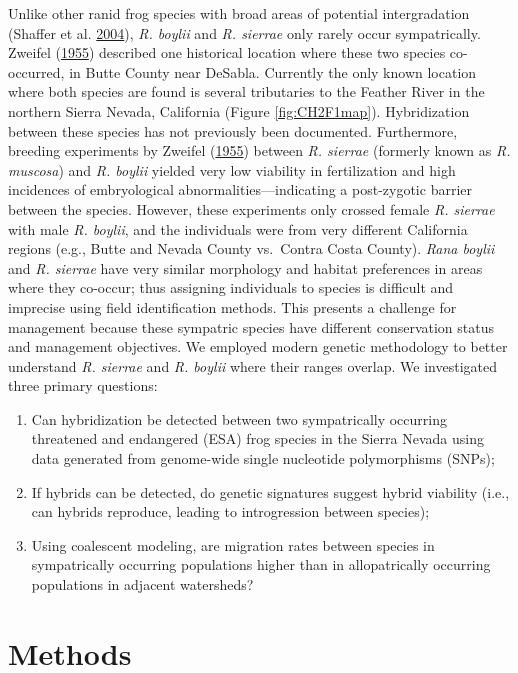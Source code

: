 \documentclass[proquest,12pt,final]{ucthesis-CA2012} %
\providecommand{\tightlist}{%
  \setlength{\itemsep}{0pt}\setlength{\parskip}{0pt}}
\begin{document}
\begin{ucmainmatter}
Unlike other ranid frog species with broad areas of potential
intergradation (Shaffer et al.
\protect\hyperlink{ref-shaffer_species_2004}{2004}), \emph{R. boylii}
and \emph{R. sierrae} only rarely occur sympatrically. Zweifel
(\protect\hyperlink{ref-zweifel_ecology_1955}{1955}) described one
historical location where these two species co-occurred, in Butte County
near DeSabla. Currently the only known location where both species are
found is several tributaries to the Feather River in the northern Sierra
Nevada, California (Figure \ref{fig:CH2F1map}). Hybridization between
these species has not previously been documented. Furthermore, breeding
experiments by Zweifel
(\protect\hyperlink{ref-zweifel_ecology_1955}{1955}) between \emph{R.
sierrae} (formerly known as \emph{R. muscosa}) and \emph{R. boylii}
yielded very low viability in fertilization and high incidences of
embryological abnormalities---indicating a post-zygotic barrier between
the species. However, these experiments only crossed female \emph{R.
sierrae} with male \emph{R. boylii}, and the individuals were from very
different California regions (e.g., Butte and Nevada County vs.~Contra
Costa County). \emph{Rana boylii} and \emph{R. sierrae} have very
similar morphology and habitat preferences in areas where they co-occur;
thus assigning individuals to species is difficult and imprecise using
field identification methods. This presents a challenge for management
because these sympatric species have different conservation status and
management objectives. We employed modern genetic methodology to better
understand \emph{R. sierrae} and \emph{R. boylii} where their ranges
overlap. We investigated three primary questions:
\begin{enumerate}
\def\labelenumi{\arabic{enumi}.}
\tightlist
\item
  Can hybridization be detected between two sympatrically occurring
  threatened and endangered (ESA) frog species in the Sierra Nevada
  using data generated from genome-wide single nucleotide polymorphisms
  (SNPs);
\item
  If hybrids can be detected, do genetic signatures suggest hybrid
  viability (i.e., can hybrids reproduce, leading to introgression
  between species);
\item
  Using coalescent modeling, are migration rates between species in
  sympatrically occurring populations higher than in allopatrically
  occurring populations in adjacent watersheds?
\end{enumerate}
\hypertarget{methods-1}{%
\section{Methods}\label{methods-1}}


\end{ucmainmatter}
\end{document}
